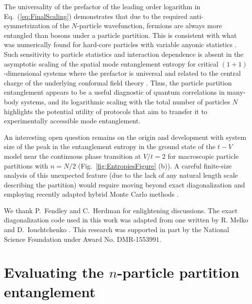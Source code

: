 The universality of the prefactor of the leading order logarithm in
Eq.~(\ref{eq:FinalScaling}) demonstrates that due to the required
anti-symmetrization of the $N$-particle wavefunction, fermions are always more
entangled than bosons under a particle partition. This is consistent with what
was numerically found for hard-core particles with variable anyonic statistics
\cite{Santachiara:2007il}.  Such sensitivity to particle statistics and
interaction dependence is absent in the asymptotic scaling of the spatial mode
entanglement entropy for critical $(1+1)$-dimensional systems where the
prefactor is universal and related to the central charge of the underlying
conformal field theory \cite{Calabrese:2004hl}.  Thus, the particle partition
entanglement appears to be a useful diagnostic of quantum correlations in
many-body systems, and its logarithmic scaling with the total number of
particles $N$ highlights the potential utility of protocols
\cite{Killoran:2014gu} that aim to transfer it to experimentally accessible
mode entanglement.

An interesting open question remains on the origin and development with system
size of the peak in the entanglement entropy in the ground state of
the $t-V$ model near the continuous phase transition at $V/t = 2$ for
macroscopic particle partitions with $n = N/2$
(Fig.~\ref{fig:EntropiesFigure} (b)). A careful finite-size analysis of this
unexpected feature (due to the lack of any natural length scale describing the
partition) would require moving beyond exact diagonalization 
and employing recently adapted hybrid Monte Carlo methods
\cite{Drut:2015fs,Drut:2016el,Porter:2016ft}. 



\ack
We thank P.~Fendley and C.~Herdman for enlightening discussions.  The exact
diagonalization code used in this work was adapted from one written by R. Melko
and D.~Iouchtchenko \cite{code}. This research was supported in part by the
National Science Foundation under Award No. DMR-1553991. 

\appendix
\section{Evaluating the $n$-particle partition entanglement}
\label{appendixA}
\renewcommand\thesubsection{\Alph{section}.\arabic{subsection}}

